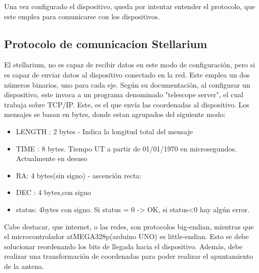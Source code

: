 Una vez configurado el dispositivo, queda por intentar entender el protocolo, que este emplea para comunicarse con los dispositivos. 

\subsection{Protocolo de comunicacion Stellarium} \label{sub:comun_stell}
El stellarium, no es capaz de recibir datos en este modo de configuración, pero si es capaz de enviar datos al dispositivo conectado en la red. Este emplea un dos números binarios, uno para cada eje. Según su documentación, al configurar un dispositivo, este invoca a un programa denominado "telescope server", el cual trabaja sobre TCP/IP. Este, es el que envía las coordenadas al dispositivo. Los mensajes se basan en bytes, donde estan agrupados del siguiente modo: 

\begin{itemize}
	\item LENGTH : 2 bytes - Indica la longitud total del mensaje
	\item TIME : 8 bytes. Tiempo UT a partir de 01/01/1970 en microsegundos. Actualmente en desuso 
	\item RA: 4 bytes(sin signo) - ascención recta: 
	\item DEC : 4 bytes,con signo
	\item status: 4bytes con signo. Si status = 0 -> OK, si status<0 hay algún error.  
\end{itemize}

Cabe destacar, que internet, o las redes, son protocolos big-endian, mientras que el microcontrolador atMEGA328p(arduino UNO) es little-endian. Esto se debe solucionar reordenando los bits de llegada hacia el dispositivo. Además, debe realizar una transformación de coordenadas para poder realizar el apuntamiento de la antena.

